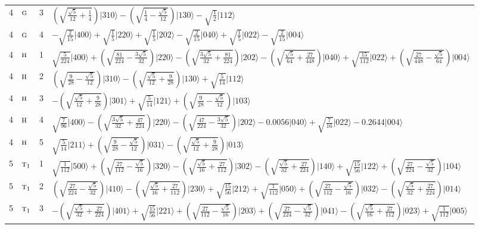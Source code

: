 \documentclass[11pt]{article}
\newcommand{\irr}[1]{\text{\normalfont\scshape #1}}
\newcommand{\occ}[1]{\lvert #1\rangle}
\begin{document}
\begin{longtable}{c l c p{}}
4 & $\irr{g}$ & 3 & $(\sqrt{\frac{\sqrt{5}}{12} + \frac{1}{4}})\occ{310}-(\sqrt{\frac{1}{4} - \frac{\sqrt{5}}{12}})\occ{130}-\sqrt{\tfrac{1}{2}}\occ{112}$\\
4 & $\irr{g}$ & 4 & $-\sqrt{\tfrac{2}{15}}\occ{400}+\sqrt{\tfrac{1}{5}}\occ{220}+\sqrt{\tfrac{1}{5}}\occ{202}-\sqrt{\tfrac{2}{15}}\occ{040}+\sqrt{\tfrac{1}{5}}\occ{022}-\sqrt{\tfrac{2}{15}}\occ{004}$\\
4 & $\irr{h}$ & 1 & $\sqrt{\tfrac{5}{224}}\occ{400}+(\sqrt{\frac{81}{224} - \frac{3 \sqrt{5}}{32}})\occ{220}-(\sqrt{\frac{3 \sqrt{5}}{32} + \frac{81}{224}})\occ{202}-(\sqrt{\frac{\sqrt{5}}{64} + \frac{27}{448}})\occ{040}+\sqrt{\tfrac{15}{112}}\occ{022}+(\sqrt{\frac{27}{448} - \frac{\sqrt{5}}{64}})\occ{004}$\\
4 & $\irr{h}$ & 2 & $(\sqrt{\frac{9}{28} - \frac{\sqrt{5}}{12}})\occ{310}-(\sqrt{\frac{\sqrt{5}}{12} + \frac{9}{28}})\occ{130}+\sqrt{\tfrac{5}{14}}\occ{112}$\\
4 & $\irr{h}$ & 3 & $-(\sqrt{\frac{\sqrt{5}}{12} + \frac{9}{28}})\occ{301}+\sqrt{\tfrac{5}{14}}\occ{121}+(\sqrt{\frac{9}{28} - \frac{\sqrt{5}}{12}})\occ{103}$\\
4 & $\irr{h}$ & 4 & $\sqrt{\tfrac{7}{96}}\occ{400}-(\sqrt{\frac{3 \sqrt{5}}{32} + \frac{47}{224}})\occ{220}-(\sqrt{\frac{47}{224} - \frac{3 \sqrt{5}}{32}})\occ{202}-0.0056\occ{040}+\sqrt{\tfrac{7}{16}}\occ{022}-0.2644\occ{004}$\\
4 & $\irr{h}$ & 5 & $\sqrt{\tfrac{5}{14}}\occ{211}+(\sqrt{\frac{9}{28} - \frac{\sqrt{5}}{12}})\occ{031}-(\sqrt{\frac{\sqrt{5}}{12} + \frac{9}{28}})\occ{013}$\\
\hline
5 & $\irr{t}_{1}$ & 1 & $\sqrt{\tfrac{1}{112}}\occ{500}+(\sqrt{\frac{27}{112} - \frac{\sqrt{5}}{16}})\occ{320}-(\sqrt{\frac{\sqrt{5}}{16} + \frac{27}{112}})\occ{302}-(\sqrt{\frac{\sqrt{5}}{32} + \frac{27}{224}})\occ{140}+\sqrt{\tfrac{15}{56}}\occ{122}+(\sqrt{\frac{27}{224} - \frac{\sqrt{5}}{32}})\occ{104}$\\
5 & $\irr{t}_{1}$ & 2 & $(\sqrt{\frac{27}{224} - \frac{\sqrt{5}}{32}})\occ{410}-(\sqrt{\frac{\sqrt{5}}{16} + \frac{27}{112}})\occ{230}+\sqrt{\tfrac{15}{56}}\occ{212}+\sqrt{\tfrac{1}{112}}\occ{050}+(\sqrt{\frac{27}{112} - \frac{\sqrt{5}}{16}})\occ{032}-(\sqrt{\frac{\sqrt{5}}{32} + \frac{27}{224}})\occ{014}$\\
5 & $\irr{t}_{1}$ & 3 & $-(\sqrt{\frac{\sqrt{5}}{32} + \frac{27}{224}})\occ{401}+\sqrt{\tfrac{15}{56}}\occ{221}+(\sqrt{\frac{27}{112} - \frac{\sqrt{5}}{16}})\occ{203}+(\sqrt{\frac{27}{224} - \frac{\sqrt{5}}{32}})\occ{041}-(\sqrt{\frac{\sqrt{5}}{16} + \frac{27}{112}})\occ{023}+\sqrt{\tfrac{1}{112}}\occ{005}$\\

\end{longtable}
\end{document}
